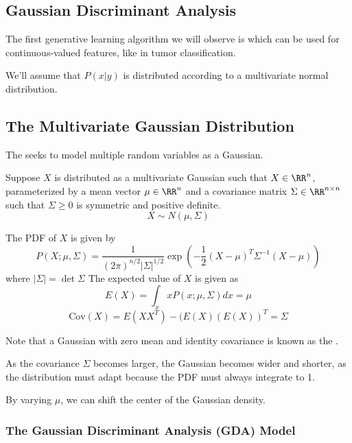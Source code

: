 \documentclass[12pt]{scrartcl}
\begin{document}
\subsection{Gaussian Discriminant Analysis}

\begin{definition}
    The first generative learning algorithm we will observe is  which can be used for continuous-valued features, like in tumor classification.
\end{definition}
We'll assume that $P(x|y)$ is distributed according to a multivariate normal distribution.

\subsection{The Multivariate Gaussian Distribution}

\begin{definition}
    The  seeks to model multiple random variables as a Gaussian.
\end{definition}
Suppose $X$ is distributed as a multivariate Gaussian such that $X \in \RR^n$, parameterized by a mean vector $\mu\in\RR^n$ and a covariance matrix $\Sigma\in\RR^{n\times n}$ such that $\Sigma \geq 0$ is symmetric and positive definite.
\[X \sim N(\mu, \Sigma)\]
\begin{lemma}
    The PDF of $X$ is given by 
\[P(X; \mu, \Sigma) = \frac{1}{(2\pi)^{n/2}|\Sigma|^{1/2}}\exp\left(-\frac{1}{2}(X - \mu)^T\Sigma^{-1}(X - \mu)\right)\]
where $|\Sigma| = \det\Sigma$
The expected value of $X$ is given as 
\[E(X) = \int_x xP(x; \mu, \Sigma) dx = \mu\]
\[\text{Cov}(X) = E(XX^T) - (E(X)(E(X))^T = \Sigma\]
\end{lemma}
\begin{note}
    Note that a Gaussian with zero mean and identity covariance is known as the .
\end{note}
\begin{note}
    As the covariance $\Sigma$ becomes larger, the Gaussian becomes wider and shorter, as the distribution must adapt because the PDF must always integrate to 1. 
\end{note}
\begin{note}
    By varying $\mu$, we can shift the center of the Gaussian density.
\end{note}

\subsubsection{The Gaussian Discriminant Analysis (GDA) Model}
\end{document}
